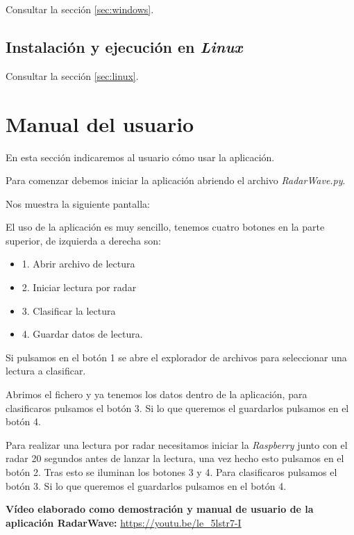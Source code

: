 Consultar la sección \ref{sec:windows}.

\subsection{Instalación y ejecución en \textit{Linux}}

Consultar la sección \ref{sec:linux}.

\section{Manual del usuario}

En esta sección indicaremos al usuario cómo usar la aplicación.

Para comenzar debemos iniciar la aplicación abriendo el archivo \textit{RadarWave.py}.

Nos muestra la siguiente pantalla:


El uso de la aplicación es muy sencillo, tenemos cuatro botones en la parte superior, de izquierda a derecha son:
\begin{itemize}
\item 1. Abrir archivo de lectura
\item 2. Iniciar lectura por radar
\item 3. Clasificar la lectura
\item 4. Guardar datos de lectura.
\end{itemize}

Si pulsamos en el botón 1 se abre el explorador de archivos para seleccionar una lectura a clasificar.

Abrimos el fichero y ya tenemos los datos dentro de la aplicación, para clasificaros pulsamos el botón 3. Si lo que queremos el guardarlos pulsamos en el botón 4.

Para realizar una lectura por radar necesitamos iniciar la \textit{Raspberry} junto con el radar 20 segundos antes de lanzar la lectura, una vez hecho esto pulsamos en el botón 2. Tras esto se iluminan los botones 3 y 4. Para clasificaros pulsamos el botón 3. Si lo que queremos el guardarlos pulsamos en el botón 4.

\textbf{Vídeo elaborado como demostración y manual de usuario de la aplicación RadarWave:} \url{https://youtu.be/le_5lstr7-I}


